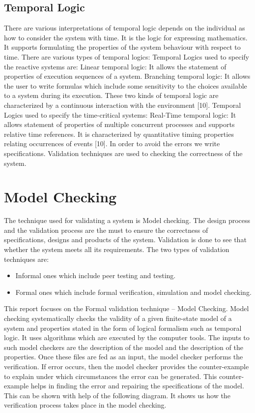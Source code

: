 \documentclass{article}
\begin{document}
 
\subsection{Temporal Logic}
\label{sec:templog}
There are various interpretations of temporal logic depends on the individual as how to consider the system with time. It is the logic for expressing mathematics. It supports formulating the properties of the system behaviour with respect to time. There are various types of temporal logics: 
 Temporal Logics used to specify the reactive systems are:
 Linear temporal logic:  It allows the statement of properties of execution sequences of a system.
 Branching temporal logic: It allows the user to write formulas which include some sensitivity to the choices available to a system during its execution. These two kinds of temporal logic are characterized by a continuous interaction with the environment [10].
Temporal Logics used to specify the time-critical systems:
 Real-Time temporal logic: It allows statement of properties of multiple concurrent processes and supports relative time references.\newline
It is characterized by quantitative timing properties relating occurrences of events [10].
In order to avoid the errors we write specifications. Validation techniques are used to checking the correctness of the system. 


\section{Model Checking}


The technique used for validating a system is Model checking. The design process and the validation process are the must to ensure the correctness of specifications, designs and products of the system. Validation is done to see that whether the system meets all its requirements. The two types of validation techniques are: 
\begin{itemize}
\item Informal ones which include peer testing and testing.	
\item Formal ones which include formal verification, simulation and model checking. 
\end{itemize}	
This report focuses on the Formal validation technique – Model Checking. Model checking systematically checks the validity of a given finite-state model of a system and properties stated in the form of logical formalism such as temporal logic. It uses algorithms which are executed by the computer tools. The inputs to such model checkers are the description of the model and the description of the properties. Once these files are fed as an input, the model checker performs the verification. If error occurs, then the model checker provides the counter-example to explain under which circumstances the error can be generated. This counter-example helps in finding the error and repairing the specifications of the model. This can be shown with help of the following diagram. It shows us how the verification process takes place in the model checking.  
\end{document}
